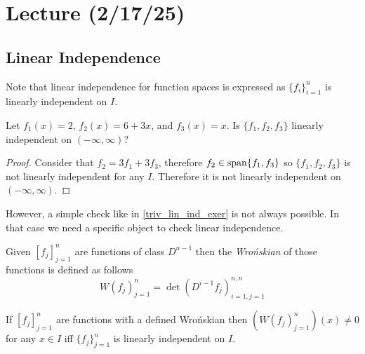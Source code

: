 \documentclass[notes]{subfiles}
\begin{document}
\setcounter{section}{8}
\section{Lecture (2/17/25)}
\subsection{Linear Independence}
Note that linear independence for function spaces is expressed as $\{ f_i \}_{i = 1}^n$ is linearly independent on $I$.

\begin{exercise} \label{triv_lin_ind_exer}
    Let $f_1(x) = 2$, $f_2(x) = 6 + 3x$, and $f_3(x) = x$. Is $\{ f_1, f_2, f_3 \}$ linearly independent on $(-\infty, \infty)$?
\end{exercise}
\begin{proof}
    Consider that $f_2 = 3f_1 + 3f_3$, therefore $f_2 \in \operatorname{span}\{ f_1, f_3 \}$ so $\{ f_1, f_2, f_3 \}$ is not linearly independent for any $I$. Therefore it is not linearly independent on $(-\infty, \infty)$.
\end{proof}

However, a simple check like in \cref{triv_lin_ind_exer} is not always possible. In that case we need a specific object to check linear independence.

\begin{definition}
    Given $[f_j]_{j = 1}^n$ are functions of class $D^{n - 1}$ then the \textit{Wro\'nskian} of those functions is defined as follows
    \[
        W(f_j)_{j = 1}^n = \det(D^{i - 1}f_j)_{i = 1, j = 1}^{n, n}
    \]
\end{definition}

\begin{theorem} \label{wronskian_theorem}
    If $[f_j]_{j = 1}^n$ are functions with a defined Wro\'nskian then $(W(f_j)_{j = 1}^n)(x) \neq 0$ for any $x \in I$ iff $\{ f_j \}_{j = 1}^n$ is linearly independent on $I$.
\end{theorem}
\end{document}
